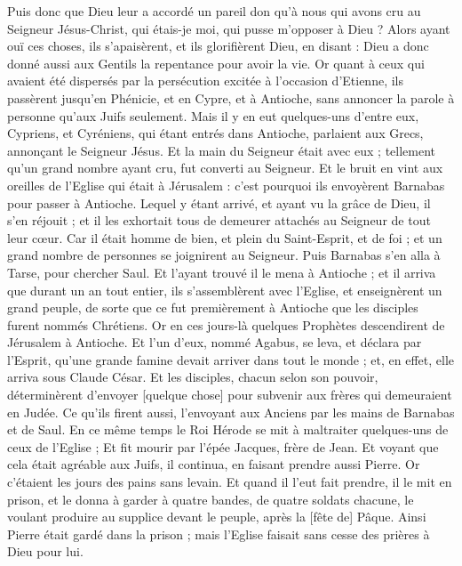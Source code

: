 \begin{multicols}{2}
Puis donc que Dieu leur a accordé un pareil don qu'à nous qui avons cru au Seigneur Jésus-Christ, qui étais-je moi, qui pusse m'opposer à Dieu ?
Alors ayant ouï ces choses, ils s'apaisèrent, et ils glorifièrent Dieu, en disant : Dieu a donc donné aussi aux Gentils la repentance pour avoir la vie.
Or quant à ceux qui avaient été dispersés par la persécution excitée à l'occasion d'Etienne, ils passèrent jusqu'en Phénicie, et en Cypre, et à Antioche, sans annoncer la parole à personne qu'aux Juifs seulement.
Mais il y en eut quelques-uns d'entre eux, Cypriens, et Cyréniens, qui étant entrés dans Antioche, parlaient aux Grecs, annonçant le Seigneur Jésus.
Et la main du Seigneur était avec eux ; tellement qu'un grand nombre ayant cru, fut converti au Seigneur.
Et le bruit en vint aux oreilles de l'Eglise qui était à Jérusalem : c'est pourquoi ils envoyèrent Barnabas pour passer à Antioche.
Lequel y étant arrivé, et ayant vu la grâce de Dieu, il s'en réjouit ; et il les exhortait tous de demeurer attachés au Seigneur de tout leur cœur.
Car il était homme de bien, et plein du Saint-Esprit, et de foi ; et un grand nombre de personnes se joignirent au Seigneur.
Puis Barnabas s'en alla à Tarse, pour chercher Saul.
Et l'ayant trouvé il le mena à Antioche ; et il arriva que durant un an tout entier, ils s'assemblèrent avec l'Eglise, et enseignèrent un grand peuple, de sorte que ce fut premièrement à Antioche que les disciples furent nommés Chrétiens.
Or en ces jours-là quelques Prophètes descendirent de Jérusalem à Antioche.
Et l'un d'eux, nommé Agabus, se leva, et déclara par l'Esprit, qu'une grande famine devait arriver dans tout le monde ; et, en effet, elle arriva sous Claude César.
Et les disciples, chacun selon son pouvoir, déterminèrent d'envoyer [quelque chose] pour subvenir aux frères qui demeuraient en Judée.
Ce qu'ils firent aussi, l'envoyant aux Anciens par les mains de Barnabas et de Saul.
\VerseOne{}En ce même temps le Roi Hérode se mit à maltraiter quelques-uns de ceux de l'Eglise ;
Et fit mourir par l'épée Jacques, frère de Jean.
Et voyant que cela était agréable aux Juifs, il continua, en faisant prendre aussi Pierre.
Or c'étaient les jours des pains sans levain. Et quand il l'eut fait prendre, il le mit en prison, et le donna à garder à quatre bandes, de quatre soldats chacune, le voulant produire au supplice devant le peuple, après la [fête de] Pâque.
Ainsi Pierre était gardé dans la prison ; mais l'Eglise faisait sans cesse des prières à Dieu pour lui.

\end{multicols}
